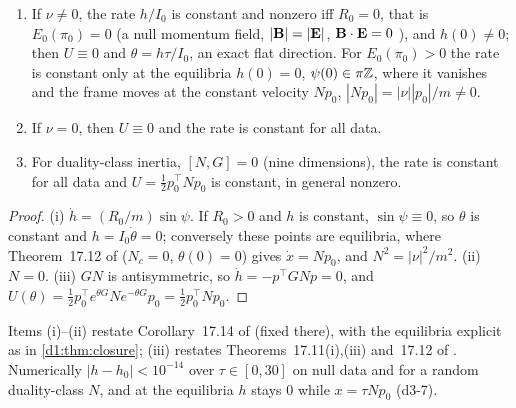\begin{corollary}
\label{d3:cor:flat}
\begin{enumerate}[label=(\roman*),leftmargin=2.2em]
\item If $\nu\neq0$, the rate $h/I_0$ is constant and nonzero iff $R_0=0$, that is $E_0(\pi_0)=0$ (a null momentum field, $|\mathbf B|=|\mathbf E|$, $\mathbf B\cdot\mathbf E=0$
\cite{Synge56}), and $h(0)\neq0$; then $U\equiv0$ and $\theta=h\tau/I_0$, an exact flat direction. For $E_0(\pi_0)>0$ the rate is constant only at
the equilibria $h(0)=0$, $\psi(0)\in\pi\mathbb{Z}$, where it vanishes and the frame moves at the constant velocity $Np_0$, $|Np_0|=|\nu||p_0|/m\neq0$.
\item If $\nu=0$, then $U\equiv0$ and the rate is constant for all data.
\item For duality-class inertia, $[N,G]=0$ (nine dimensions), the rate is constant for all data and $U=\tfrac12p_0^{\!\top}Np_0$ is constant, in
general nonzero.
\end{enumerate}
\end{corollary}

\begin{proof}
(i) $\dot h=(R_0/m)\sin\psi$. If $R_0>0$ and $h$ is constant, $\sin\psi\equiv0$, so $\theta$ is constant and $h=I_0\dot\theta=0$; conversely these points
are equilibria, where Theorem~17.12 of \cite{ES17} ($N_c=0$, $\theta(0)=0$) gives $\dot x=Np_0$, and $N^2=|\nu|^2/m^2$. (ii) $N=0$. (iii) $GN$ is
antisymmetric, so $\dot h=-p^{\!\top}GNp=0$, and $U(\theta)=\tfrac12p_0^{\!\top}e^{\theta G}Ne^{-\theta G}p_0=\tfrac12p_0^{\!\top}Np_0$.
\end{proof}

Items (i)--(ii) restate Corollary~17.14 of \cite{ES17} (fixed there), with the equilibria explicit as in \cref{d1:thm:closure}; (iii) restates
Theorems~17.11(i),(iii) and~17.12 of \cite{ES17}. Numerically $|h-h_0|<10^{-14}$ over $\tau\in[0,30]$ on null data and for a random duality-class $N$,
and at the equilibria $h$ stays $0$ while $x=\tau Np_0$ (d3-7).

